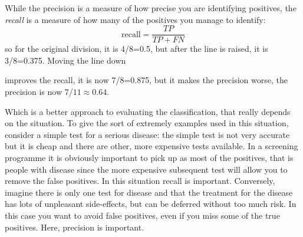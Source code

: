 \documentclass[12pt]{article}
\begin{document}
While the precision is a measure of how precise you are identifying
positives, the \textsl{recall} is a measure of how many of the positives you manage to identify:
\begin{equation}
  \mbox{recall}=\frac{TP}{TP+FN}
  \end{equation}
so for the original division, it is 4/8=0.5, but after the line is raised, it is 3/8=0.375. Moving the line down
\begin{center}

\end{center}
improves the recall, it is now 7/8=0.875, but it makes the precision
worse, the precision is now $7/11\approx 0.64$.

Which is a better approach to evaluating the classification, that
really depends on the situation. To give the sort of extremely
examples used in this situation, consider a simple test for a serious
disease: the simple test is not very accurate but it is cheap and
there are other, more expensive tests available. In a screening
programme it is obviously important to pick up as most of the
positives, that is people with disease since the more expensive
subsequent test will allow you to remove the false positives. In this
situation recall is important. Conversely, imagine there is only one
test for disease and that the treatment for the disease has lots of
unpleasant side-effects, but can be deferred without too much risk. In
this case you want to avoid false positives, even if you miss some of
the true positives. Here, precision is important.
\end{document}
